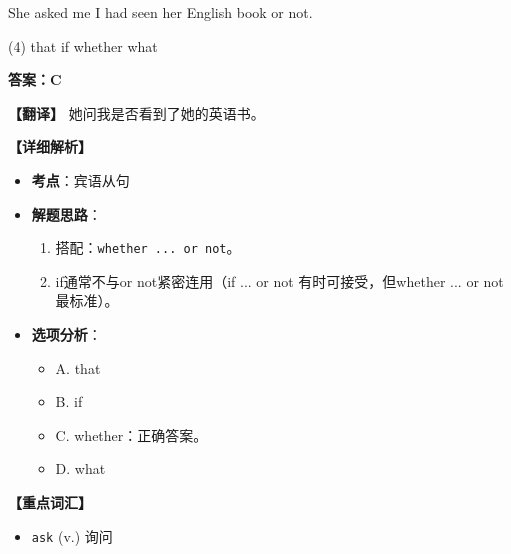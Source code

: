 \documentclass[11pt, a4paper]{article}
\newcommand{\analysis}[4]{
    \begin{solutionbox}
        \textbf{答案：#1}
        
        \textbf{【翻译】} #2
        
        \textbf{【详细解析】}
        #3
        
        \textbf{【重点词汇】}
        #4
    \end{solutionbox}
}
\newcommand{\blank}{\underline{\hspace{1.5cm}}}
\begin{document}
\begin{questions}
    \item She asked me \blank I had seen her English book or not.
    \begin{tasks}(4)
        \task that \task if \task whether \task what
    \end{tasks}
    \analysis{C}{她问我是否看到了她的英语书。}{
        \begin{itemize}
            \item \textbf{考点}：宾语从句
            \item \textbf{解题思路}：
                \begin{enumerate}
                    \item 搭配：\texttt{whether ... or not}。
                    \item if通常不与or not紧密连用（if ... or not 有时可接受，但whether ... or not最标准）。
                \end{enumerate}
            \item \textbf{选项分析}：
                \begin{itemize}
                    \item A. that
                    \item B. if
                    \item C. whether：正确答案。
                    \item D. what
                \end{itemize}
        \end{itemize}
    }{
        \begin{itemize}
            \item \texttt{ask} (v.) 询问
        \end{itemize}
    }


\end{questions}
\end{document}

